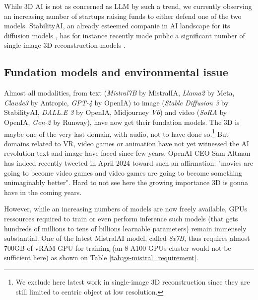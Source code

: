 While 3D \ac{AI} is not as concerned as \ac{LLM} by such a trend, we currently observing an increasing number of startups raising funds to either defend one of the two models. StabilityAI, an already esteemed companie in \ac{AI} landscape for its diffusion models \citep{esser2024scaling}, has for instance recently made public a significant number of single-image 3D reconstruction models \citep{tochilkin2024triposr,voleti2024sv3d}. 

\subsection{Fundation models and environmental issue}

Almost all modalities, from text (\textit{Mistral7B} by MistralIA, \textit{Llama2} by Meta, \textit{Claude3} by Antropic, \textit{GPT-4} by OpenIA) to image (\textit{Stable Diffusion 3} by StabilityAI, \textit{DALL.E 3} by OpenIA, Midjourney \textit{V6}) and video (\textit{SoRA} by OpenIA, \textit{Gen-2} by Runway), have now get their fundation models. The 3D is maybe one of the very last domain, with audio, not to have done so.\footnote{We exclude here latest work in single-image 3D reconstruction since they are still limited to centric object at low resolution.} But domains related to \ac{VR}, video games or animation have not yet witnessed the \ac{AI} revolution text and image have faced since few years. OpenAI CEO Sam Altman has indeed recently tweeted in April 2024 toward such an affirmation: "movies are going to become video games and video games are going to become something unimaginably better". Hard to not see here the growing importance 3D is gonna have in the coming years. 

However, while an increasing numbers of models are now freely available, \ac{GPU}s ressources required to train or even perform inference such models (that gets hundreds of millions to tens of billions learnable parameters) remain immensely substantial. One of the latest MistralAI model, called \textit{8x7B}, thus requires almost 700GB of vRAM \ac{GPU} for training (an 8-A100 \ac{GPU}s cluster would not be sufficient here) as shown on Table \ref{tab:gs-mistral_requirement}. 

